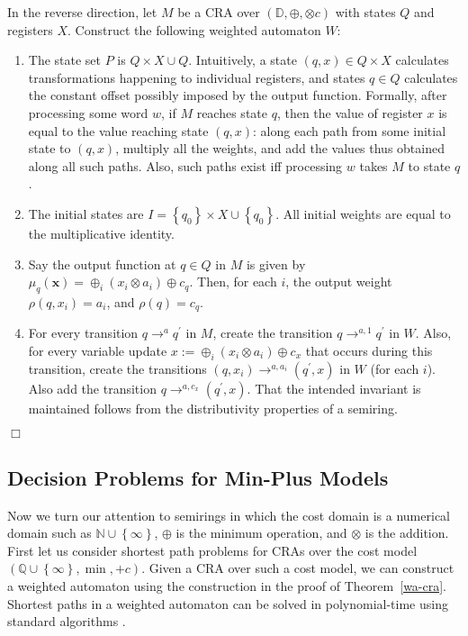 \documentclass[11pt]{article}
\def\qed{{\bf $\Box$}}
\newcommand{\mypar}[1]{\subsection{#1}}
\def\qed{{\bf $\Box$}}
\newcommand{\domain}{\ensuremath{\mathbb{D}}}
\newcommand{\Nat}{\ensuremath{\mathbb{N}}}
\newcommand{\sradd}{\oplus}
\newcommand{\srmul}{\otimes}
\begin{document}
In the reverse direction, let $M$ be a CRA over $\left(\domain,\sradd,\srmul c\right)$
with states $Q$ and registers $X$. Construct the following weighted
automaton $W$:
\begin{enumerate}
\item The state set $P$ is $Q\times X\cup Q$. Intuitively, a state $\left(q,x\right)\in Q\times X$
calculates transformations happening to individual registers, and
states $q\in Q$ calculates the constant offset possibly imposed by
the output function. Formally, after processing some word $w$, if
$M$ reaches state $q$, then the value of register $x$ is equal
to the value reaching state $\left(q,x\right)$: along each path from
some initial state to $\left(q,x\right)$, multiply all the weights,
and add the values thus obtained along all such paths. Also, such
paths exist iff processing $w$ takes $M$ to state $q$.
\item The initial states are $I=\left\{ q_{0}\right\} \times X\cup\left\{ q_{0}\right\} $.
All initial weights are equal to the multiplicative identity.
\item Say the output function at $q\in Q$ in $M$ is given by $\mu_{q}\left(\mathbf{x}\right)=\sradd_{i}\left(x_{i}\srmul a_{i}\right)\sradd c_{q}$.
Then, for each $i$, the output weight $\rho\left(q,x_{i}\right)=a_{i}$,
and $\rho\left(q\right)=c_{q}$.
\item For every transition $q\to^{a}q^{\prime}$ in $M$, create the transition
$q\to^{a,1}q^{\prime}$ in $W$. Also, for every variable update $x:=\sradd_{i}\left(x_{i}\srmul a_{i}\right)\sradd c_{x}$
that occurs during this transition, create the transitions $\left(q,x_{i}\right)\to^{a,a_{i}}\left(q^{\prime},x\right)$
in $W$ (for each $i$). Also add the transition $q\to^{a,c_{x}}\left(q^{\prime},x\right)$.
That the intended invariant is maintained follows from the distributivity
properties of a semiring.\end{enumerate}
\qed


\mypar{Decision Problems for Min-Plus Models}
Now we turn our attention to semirings in which the cost domain
is a numerical domain such as $\Nat\cup \left\{\infty\right\}$, $\sradd$ is the minimum operation, and $\srmul$ is the addition.
First let us consider shortest path problems for CRAs over the cost model $({\mathbb Q\cup \left\{\infty\right\}},\min,+c)$.
Given a CRA over such a cost model, we can construct a weighted automaton using the construction
in the proof of Theorem~\ref{wa-cra}.
Shortest paths in a weighted automaton can be solved in polynomial-time using standard algorithms \cite{mohri_weighted_2009}.
\end{document}
